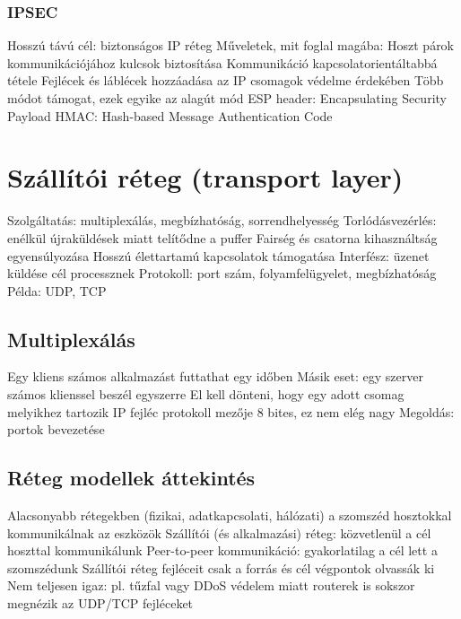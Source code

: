 \documentclass[12pt,a4paper]{article}
\begin{document}
\subsubsection{IPSEC}

\begin{outline}
	\1 Hosszú távú cél: biztonságos IP réteg
	\1 Műveletek, mit foglal magába:
		\2 Hoszt párok kommunikációjához kulcsok biztosítása
		\2 Kommunikáció kapcsolatorientáltabbá tétele
		\2 Fejlécek és láblécek hozzáadása az IP csomagok védelme érdekében
	\1 Több módot támogat, ezek egyike az alagút mód
		\2 ESP header: Encapsulating Security Payload
		\2 HMAC: Hash-based Message Authentication Code
\end{outline}

\pagebreak

\section{Szállítói réteg (transport layer)}

\begin{outline}
	\1 Szolgáltatás: multiplexálás, megbízhatóság, sorrendhelyesség
		\2 Torlódásvezérlés: enélkül újraküldések miatt telítődne a puffer
		\2 Fairség és csatorna kihasználtság egyensúlyozása
		\2 Hosszú élettartamú kapcsolatok támogatása
	\1 Interfész: üzenet küldése cél processznek
	\1 Protokoll: port szám, folyamfelügyelet, megbízhatóság
	\1 Példa: UDP, TCP
\end{outline}

\subsection{Multiplexálás}

\begin{outline}
	\1 Egy kliens számos alkalmazást futtathat egy időben
		\2 Másik eset: egy szerver számos klienssel beszél egyszerre
	\1 El kell dönteni, hogy egy adott csomag melyikhez tartozik
	\1 IP fejléc protokoll mezője 8 bites, ez nem elég nagy
	\1 Megoldás: portok bevezetése
\end{outline}

\subsection{Réteg modellek áttekintés}

\begin{outline}
	\1 Alacsonyabb rétegekben (fizikai, adatkapcsolati, hálózati) a szomszéd hosztokkal kommunikálnak az eszközök
	\1 Szállítói (és alkalmazási) réteg: közvetlenül a cél hoszttal kommunikálunk
		\2 Peer-to-peer kommunikáció: gyakorlatilag a cél lett a szomszédunk
		\2 Szállítói réteg fejléceit csak a forrás és cél végpontok olvassák ki
			\3 Nem teljesen igaz: pl. tűzfal vagy DDoS védelem miatt routerek is sokszor megnézik az UDP/TCP fejléceket
\end{outline}
\end{document}
